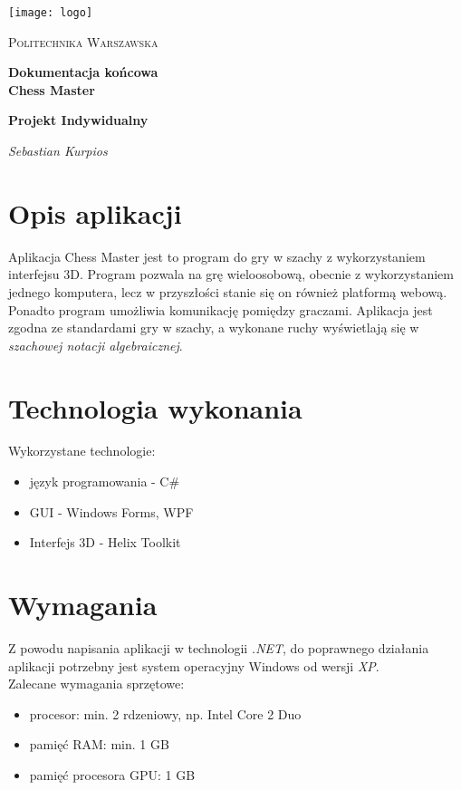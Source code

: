 \documentclass[12pt]{article}
\begin{document}
\begin{titlepage}
\centering
\texttt{[image: logo]}\par\vspace{1cm}
{\scshape\LARGE Politechnika Warszawska \par}
\vspace{1cm}
{\huge\bfseries  Dokumentacja końcowa \linebreak \\  Chess Master\par}
\vspace{1cm}
{\bfseries Projekt Indywidualny \par}
\vspace{2cm}
{\Large\itshape  Sebastian Kurpios \par}
\end{titlepage}

\tableofcontents
\newpage

\section{Opis aplikacji}
Aplikacja Chess Master jest to program do gry w szachy z wykorzystaniem interfejsu 3D. Program pozwala na grę wieloosobową, obecnie z wykorzystaniem jednego komputera, lecz w przyszłości stanie się on również platformą webową. Ponadto program umożliwia komunikację pomiędzy graczami. Aplikacja jest zgodna ze standardami gry w szachy, a wykonane ruchy wyświetlają się w \textit{szachowej notacji algebraicznej}.
   
\section{Technologia wykonania}
Wykorzystane technologie:
\begin{itemize}
\item język programowania - C\#
\item GUI - Windows Forms, WPF
\item Interfejs 3D - Helix Toolkit
\end{itemize}   
   
\section{Wymagania}
Z powodu napisania aplikacji w technologii \textit{.NET}, do poprawnego działania aplikacji potrzebny jest system operacyjny Windows od wersji \textit{XP}. \\
Zalecane wymagania sprzętowe:
\begin{itemize}
\item procesor: min. 2 rdzeniowy, np. Intel Core 2 Duo
\item pamięć RAM: min. 1 GB
\item pamięć procesora GPU: 1 GB
\end{itemize}
\end{document}
